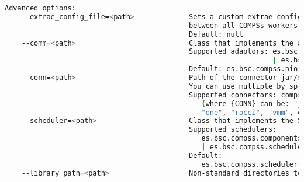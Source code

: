 \begin{lstlisting}[language=bash]
  Advanced options:                                                                                                                                                                     
    --extrae_config_file=<path>             Sets a custom extrae config file. Must be in a shared disk
                                            between all COMPSs workers.                                                      
                                            Default: null                                                                                                                               
    --comm=<path>                           Class that implements the adaptor for communications                                                                                        
                                            Supported adaptors: es.bsc.compss.nio.master.NIOAdaptor 
                                                                | es.bsc.compss.gat.master.GATAdaptor                                       
                                            Default: es.bsc.compss.nio.master.NIOAdaptor                                                                                            
    --conn=<path>                           Path of the connector jar/s that should be loaded. 
                                            You can use multiple by splitting with ':'                                               
                                            Supported connectors: compss-{CONN}-connector.jar                                                                                           
                                               (where {CONN} can be: "jclouds", "amazon", "docker", 
                                               "one", "rocci", "vmm", etc.)                                                        
    --scheduler=<path>                      Class that implements the Scheduler for COMPSs                                                                                              
                                            Supported schedulers: 
                                               es.bsc.compss.components.impl.TaskScheduler 
                                               | es.bsc.compss.scheduler.readyscheduler.ReadyScheduler           
                                            Default: 
                                               es.bsc.compss.scheduler.readyscheduler.ReadyScheduler                                                                          
    --library_path=<path>                   Non-standard directories to search for libraries (e.g. Java 

\end{lstlisting}
